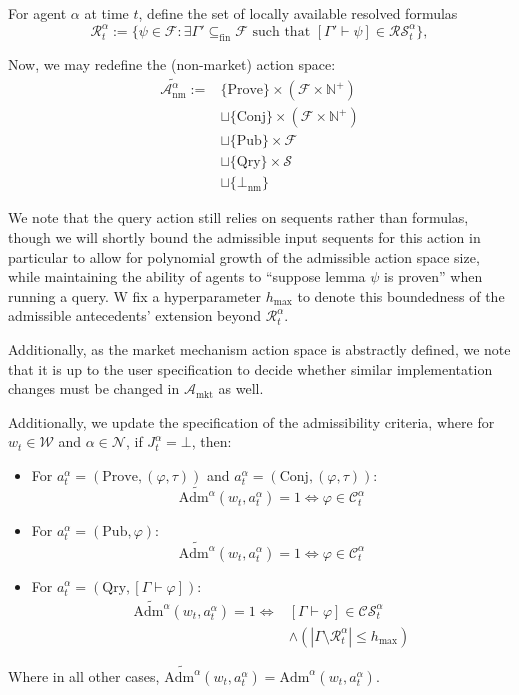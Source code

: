 \documentclass[letterpaper]{article} %
\renewcommand{\phi}{\varphi}
\newcommand{\proves}{\vdash}
\begin{document}
For agent $\alpha$ at time $t$, define the set of locally available resolved formulas
\[
\mathcal{R}^\alpha_t
:= \Big\{\psi\in\mathcal{F}:\exists \Gamma'\subseteq_{\mathrm{fin}}\mathcal{F}\text{ such that }[\Gamma'\proves \psi]\in\mathcal{RS}^\alpha_t\Big\},
\]

Now, we may redefine the (non-market) action space:
\begin{align*}
\widetilde{\mathcal{A}_{\mathrm{nm}}^\alpha}
:=
&
\{\mathrm{Prove}\}\times(\mathcal{F}\times\mathbb{N}^+)
\\&\sqcup
\{\mathrm{Conj}\}\times(\mathcal{F}\times\mathbb{N}^+)
\\&\sqcup
\{\mathrm{Pub}\}\times\mathcal{F}
\\&\sqcup
\{\mathrm{Qry}\}\times \mathcal{S}
\\&\sqcup\{\bot_{\mathrm{nm}}\}
\end{align*}

We note that the query action still relies on sequents rather than formulas, though we will shortly bound the admissible input sequents for this action in particular to allow for polynomial growth of the admissible action space size, while maintaining the ability of agents to ``suppose lemma $\psi$ is proven'' when running a query. W fix a hyperparameter $h_{\mathrm{max}}$ to denote this boundedness of the admissible antecedents' extension beyond $\mathcal{R}^\alpha_t$.

Additionally, as the market mechanism action space is abstractly defined, we note that it is up to the user specification to decide whether similar implementation changes must be changed in $\mathcal{A}_{\mathrm{mkt}}$ as well.

Additionally, we update the specification of the admissibility criteria, where for $w_t \in \mathcal{W}$ and $\alpha \in \mathcal{N}$, if $J^\alpha_t=\bot$, then:
\begin{itemize}
\item For $a^\alpha_t = (\mathrm{Prove},(\phi,\tau))$ and $a^\alpha_t = (\mathrm{Conj},(\phi,\tau))$:
\[
\widetilde{\mathrm{Adm}^\alpha}(w_t,a^\alpha_t)=1 \iff \phi \in \mathcal{C}_t^\alpha
\]
\item For $a^\alpha_t = (\mathrm{Pub},\phi)$: \[\widetilde{\mathrm{Adm}^\alpha}(w_t,a^\alpha_t)=1 \iff \phi \in \mathcal{C}_t^\alpha\]
\item For $a^\alpha_t = (\mathrm{Qry},[\Gamma \proves \phi])$: 
\begin{align*}
    \widetilde{\mathrm{Adm}^\alpha}(w_t,a_t^\alpha)=1 \iff &[\Gamma \proves \phi] \in \mathcal{CS}_t^\alpha \\&\land (|\Gamma \setminus \mathcal{R}^\alpha_t| \le h_{\mathrm{max}})
\end{align*}
\end{itemize}
Where in all other cases, $\widetilde{\mathrm{Adm}^\alpha}(w_t,a_t^\alpha) =\mathrm{Adm}^\alpha(w_t,a_t^\alpha)$. 
\end{document}
